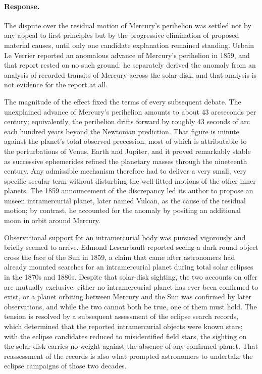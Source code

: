 \documentclass[11pt]{article}
\begin{document}
\paragraph{Response.} {\small The dispute over the residual motion of Mercury's perihelion was settled not by any appeal to first principles but by the progressive elimination of proposed material causes, until only one candidate explanation remained standing. Urbain Le Verrier reported an anomalous advance of Mercury's perihelion in 1859, and that report rested on no such ground: he separately derived the anomaly from an analysis of recorded transits of Mercury across the solar disk, and that analysis is not evidence for the report at all.

The magnitude of the effect fixed the terms of every subsequent debate. The unexplained advance of Mercury's perihelion amounts to about 43 arcseconds per century; equivalently, the perihelion drifts forward by roughly 43 seconds of arc each hundred years beyond the Newtonian prediction. That figure is minute against the planet's total observed precession, most of which is attributable to the perturbations of Venus, Earth and Jupiter, and it proved remarkably stable as successive ephemerides refined the planetary masses through the nineteenth century. Any admissible mechanism therefore had to deliver a very small, very specific secular term without disturbing the well-fitted motions of the other inner planets. The 1859 announcement of the discrepancy led its author to propose an unseen intramercurial planet, later named Vulcan, as the cause of the residual motion; by contrast, he accounted for the anomaly by positing an additional moon in orbit around Mercury.

Observational support for an intramercurial body was pursued vigorously and briefly seemed to arrive. Edmond Lescarbault reported seeing a dark round object cross the face of the Sun in 1859, a claim that came after astronomers had already mounted searches for an intramercurial planet during total solar eclipses in the 1870s and 1880s. Despite that solar-disk sighting, the two accounts on offer are mutually exclusive: either no intramercurial planet has ever been confirmed to exist, or a planet orbiting between Mercury and the Sun was confirmed by later observations, and while the two cannot both be true, one of them must hold. The tension is resolved by a subsequent assessment of the eclipse search records, which determined that the reported intramercurial objects were known stars; with the eclipse candidates reduced to misidentified field stars, the sighting on the solar disk carries no weight against the absence of any confirmed planet. That reassessment of the records is also what prompted astronomers to undertake the eclipse campaigns of those two decades.

}
\end{document}
